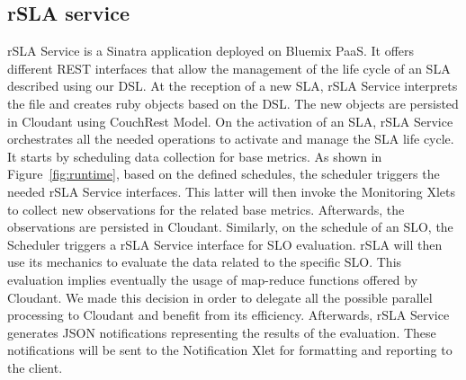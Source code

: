 \subsection{rSLA service}
rSLA Service is a Sinatra application deployed on Bluemix PaaS. It offers different REST interfaces that allow the management of the life cycle of an SLA described using our DSL.
At the reception of a new SLA, rSLA Service interprets the file and creates ruby objects based on the DSL. The new objects are persisted in Cloudant using CouchRest Model.
On the activation of an SLA, rSLA Service orchestrates all the needed operations to activate and manage the SLA life cycle. It starts by scheduling data collection for base 
metrics. As shown in Figure~\ref{fig:runtime}, based on the defined schedules, the scheduler triggers the needed rSLA Service interfaces. This latter will then invoke the 
Monitoring Xlets to collect new observations for the related base metrics. Afterwards, the observations are persisted in Cloudant. Similarly, on the schedule of an SLO, the 
Scheduler triggers a rSLA Service interface for SLO evaluation. rSLA will then use its mechanics to evaluate the data related to the specific SLO. This evaluation implies 
eventually the usage of map-reduce functions offered by Cloudant. We made this decision in order to delegate all the possible parallel processing to Cloudant and benefit from its 
efficiency. Afterwards, rSLA Service generates JSON notifications representing the results of the evaluation. These notifications will be sent to the Notification Xlet for 
formatting and reporting to the client.   
